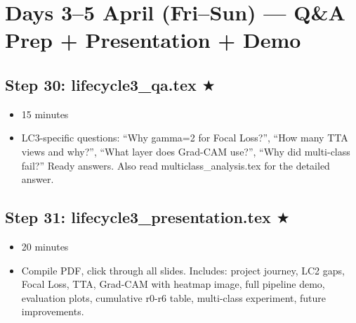 \documentclass[12pt,a4paper]{article}
\begin{document}
\section{Days 3--5 April (Fri--Sun) --- Q\&A Prep + Presentation + Demo}

\begin{center}
\end{center}

\subsection*{Step 30: lifecycle3\_qa.tex $\bigstar$}
\begin{itemize}[leftmargin=1.5cm]
    \item[\textbf{Time:}] 15 minutes
    \item[\textbf{What you learn:}] LC3-specific questions: ``Why gamma=2 for Focal Loss?'', ``How many TTA views and why?'', ``What layer does Grad-CAM use?'', ``Why did multi-class fail?'' Ready answers. Also read multiclass\_analysis.tex for the detailed answer.
\end{itemize}

\subsection*{Step 31: lifecycle3\_presentation.tex $\bigstar$}
\begin{itemize}[leftmargin=1.5cm]
    \item[\textbf{Time:}] 20 minutes
    \item[\textbf{Action:}] Compile PDF, click through all slides. Includes: project journey, LC2 gaps, Focal Loss, TTA, Grad-CAM with heatmap image, full pipeline demo, evaluation plots, cumulative r0-r6 table, multi-class experiment, future improvements.
\end{itemize}
\end{document}
